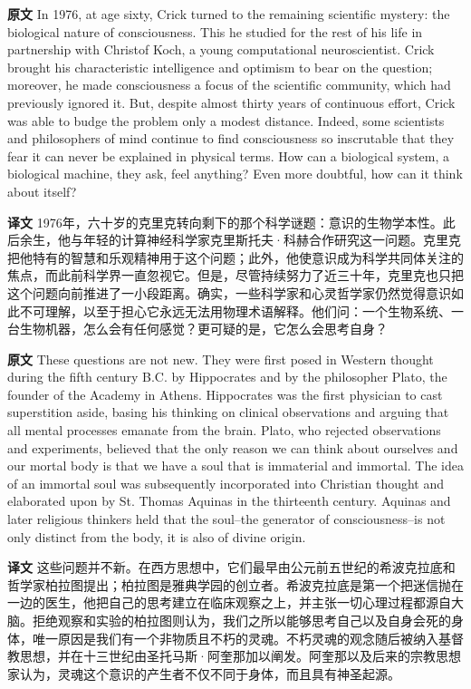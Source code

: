 \documentclass[UTF8]{ctexart}
\newenvironment{english}{\par\small\noindent\textbf{原文}\quad\ignorespaces}{\par}
\newenvironment{zhtranslation}{\par\noindent\textbf{译文}\quad\ignorespaces}{\par\vspace{0.35em}}
\begin{document}
\begin{english}
In 1976, at age sixty, Crick turned to the remaining scientific mystery: the biological nature of consciousness. This he studied for the rest of his life in partnership with Christof Koch, a young computational neuroscientist. Crick brought his characteristic intelligence and optimism to bear on the question; moreover, he made consciousness a focus of the scientific community, which had previously ignored it. But, despite almost thirty years of continuous effort, Crick was able to budge the problem only a modest distance. Indeed, some scientists and philosophers of mind continue to find consciousness so inscrutable that they fear it can never be explained in physical terms. How can a biological system, a biological machine, they ask, feel anything? Even more doubtful, how can it think about itself?
\end{english}
\begin{zhtranslation}
1976年，六十岁的克里克转向剩下的那个科学谜题：意识的生物学本性。此后余生，他与年轻的计算神经科学家克里斯托夫·科赫合作研究这一问题。克里克把他特有的智慧和乐观精神用于这个问题；此外，他使意识成为科学共同体关注的焦点，而此前科学界一直忽视它。但是，尽管持续努力了近三十年，克里克也只把这个问题向前推进了一小段距离。确实，一些科学家和心灵哲学家仍然觉得意识如此不可理解，以至于担心它永远无法用物理术语解释。他们问：一个生物系统、一台生物机器，怎么会有任何感觉？更可疑的是，它怎么会思考自身？
\end{zhtranslation}

\begin{english}
These questions are not new. They were first posed in Western thought during the fifth century B.C. by Hippocrates and by the philosopher Plato, the founder of the Academy in Athens. Hippocrates was the first physician to cast superstition aside, basing his thinking on clinical observations and arguing that all mental processes emanate from the brain. Plato, who rejected observations and experiments, believed that the only reason we can think about ourselves and our mortal body is that we have a soul that is immaterial and immortal. The idea of an immortal soul was subsequently incorporated into Christian thought and elaborated upon by St. Thomas Aquinas in the thirteenth century. Aquinas and later religious thinkers held that the soul--the generator of consciousness--is not only distinct from the body, it is also of divine origin.
\end{english}
\begin{zhtranslation}
这些问题并不新。在西方思想中，它们最早由公元前五世纪的希波克拉底和哲学家柏拉图提出；柏拉图是雅典学园的创立者。希波克拉底是第一个把迷信抛在一边的医生，他把自己的思考建立在临床观察之上，并主张一切心理过程都源自大脑。拒绝观察和实验的柏拉图则认为，我们之所以能够思考自己以及自身会死的身体，唯一原因是我们有一个非物质且不朽的灵魂。不朽灵魂的观念随后被纳入基督教思想，并在十三世纪由圣托马斯·阿奎那加以阐发。阿奎那以及后来的宗教思想家认为，灵魂这个意识的产生者不仅不同于身体，而且具有神圣起源。\end{zhtranslation}
\end{document}
